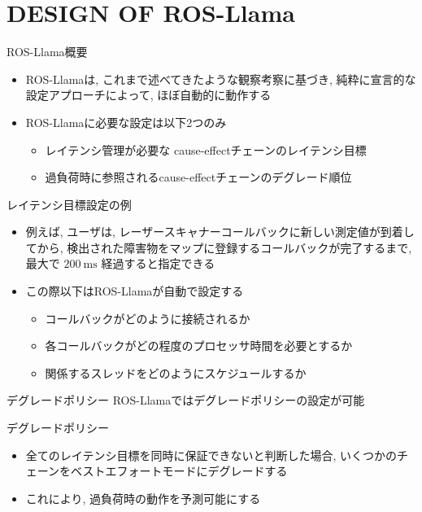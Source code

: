 
\section{DESIGN OF ROS-Llama}
\label{sec: design of ros-llama}

\begin{frame}{ROS-Llama概要}
    \begin{itemize}
        \item ROS-Llamaは, これまで述べてきたような観察考察に基づき, 純粋に宣言的な設定アプローチによって, ほぼ自動的に動作する
        \item ROS-Llamaに必要な設定は以下2つのみ
              \begin{itemize}
                  \item レイテンシ管理が必要な cause-effectチェーンのレイテンシ目標
                  \item 過負荷時に参照されるcause-effectチェーンのデグレード順位
              \end{itemize}
    \end{itemize}
\end{frame}

\begin{frame}{レイテンシ目標設定の例}
    \begin{itemize}
        \item 例えば, ユーザは, レーザースキャナーコールバックに新しい測定値が到着してから, 検出された障害物をマップに登録するコールバックが完了するまで, 最大で $200 \mathrm{~ms}$ 経過すると指定できる
        \item この際以下はROS-Llamaが自動で設定する
              \begin{itemize}
                  \item コールバックがどのように接続されるか
                  \item 各コールバックがどの程度のプロセッサ時間を必要とするか
                  \item 関係するスレッドをどのようにスケジュールするか
              \end{itemize}
    \end{itemize}
\end{frame}

\begin{frame}{デグレードポリシー}
    ROS-Llamaではデグレードポリシーの設定が可能
    \begin{block}{デグレードポリシー}
        \setlength{\linewidth}{0.98\columnwidth}
        \begin{itemize}
            \item 全てのレイテンシ目標を同時に保証できないと判断した場合, いくつかのチェーンをベストエフォートモードにデグレードする
            \item これにより, 過負荷時の動作を予測可能にする
        \end{itemize}
    \end{block}
\end{frame}

